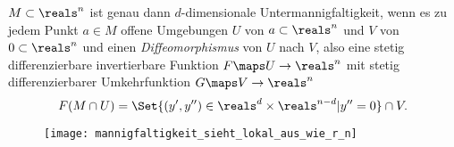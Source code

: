 \begin{satz}\label{mannigfaltigkeit_sieht_lokal_aus_wie_r_n}
  \( M\subset \reals^n \) ist genau dann \( d \)-dimensionale Untermannigfaltigkeit, wenn es zu jedem Punkt \( a\in M \) offene Umgebungen \( U \) von \( a\subset \reals^n \) und \( V \) von \( 0\subset \reals^n \) und einen \emph{Diffeomorphismus} von \( U \) nach \( V \), also eine stetig differenzierbare invertierbare Funktion \( F\maps U\to \reals^n \) mit stetig differenzierbarer Umkehrfunktion \( G\maps V\to \reals^n \) \sd 
  \begin{equation*}
    F(M\cap U)=\Set{(y',y'')\in \reals^d\times \reals^{n-d}|y''=0}\cap V.
  \end{equation*}
  \begin{figure}[H]
    \centering
    \texttt{[image: mannigfaltigkeit\_sieht\_lokal\_aus\_wie\_r\_n]}
    \label{fig:mannigfaltigkeit_sieht_lokal_aus_wie_r_n}
  \end{figure}
\end{satz}
